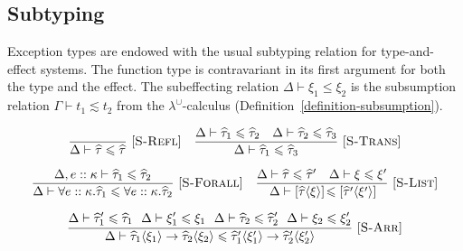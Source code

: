 \documentclass{llncs}
\renewcommand{\leq}{\leqslant}
\newcommand{\Rule}[3]{\frac{#2}{#3}\mbox{\ [\textsc{#1}]}}
\newcommand{\LambdaUnion}{\lambda^\cup}
\newcommand{\LuEnv}{\Gamma}
\newcommand{\LuTm}{t}
\newcommand{\JudgeLuSub}[3][\LuEnv]{#1 \vdash #2 \lesssim #3}
\newcommand{\Throws}[2]{#1\langle #2\rangle}    %
\newcommand{\ExnTy}{\widehat\tau}
\newcommand{\ExnTyBool}{\mathrm{b\widehat{oo}l}}    %
\newcommand{\ExnTyList}[2]{\left[\Throws{#1}{#2}\right]\!}
\newcommand{\ExnTyArr}[4]{\Throws{#1}{#2} \to \Throws{#3}{#4}}
\newcommand{\ExnForall}[1]{\forall {#1}.}           %
\newcommand{\Exn}{\xi}
\newcommand{\ExnVar}{e}
\newcommand{\ExnBool}{\mathbf{b\widehat{oo}l}}      %
\newcommand{\ExnInt}{\mathbf{i\widehat{n}t}}        %
\newcommand{\Kind}{\kappa}                          %
\newcommand{\KiEnv}{\Delta}
\newcommand{\JudgeSubTy}[3]{{#1 \vdash #2 \leq #3}}
\newcommand{\JudgeSubExn}[3]{{#1 \vdash #2 \leq #3}}
\begin{document}
\subsection{Subtyping}

Exception types are endowed with the usual subtyping relation for type-and-effect systems. The function type is contravariant in its first argument for both the type and the effect. The subeffecting relation $\JudgeSubExn{\KiEnv}{\Exn_1}{\Exn_2}$ is the subsumption relation $\JudgeLuSub{\LuTm_1}{\LuTm_2}$ from the $\LambdaUnion$-calculus (Definition~\ref{definition-subsumption}).

    \begin{gather*}
        \Rule{S-Refl}
             {}
             {\JudgeSubTy{\KiEnv}{\ExnTy}{\ExnTy}}
        \quad
        \Rule{S-Trans}
             {\JudgeSubTy{\KiEnv}{\ExnTy_1}{\ExnTy_2}
              \quad
              \JudgeSubTy{\KiEnv}{\ExnTy_2}{\ExnTy_3}
             }
             {\JudgeSubTy{\KiEnv}{\ExnTy_1}{\ExnTy_3}}
        \\[1.5ex]
        \Rule{S-Forall}
             {\JudgeSubTy{\KiEnv, \ExnVar :: \Kind}{\ExnTy_1}{\ExnTy_2}}
             {\JudgeSubTy{\KiEnv}
                         {\ExnForall{\ExnVar :: \Kind}{\ExnTy_1}}
                         {\ExnForall{\ExnVar :: \Kind}{\ExnTy_2}}
             }
        \quad
        \Rule{S-List}
             {\JudgeSubTy{\KiEnv}{\ExnTy}{\ExnTy^\prime}
                \quad
              \JudgeSubExn{\KiEnv}{\Exn}{\Exn^\prime}
             }
             {\JudgeSubTy{\KiEnv}
                         {\ExnTyList{\ExnTy}{\Exn}}
                         {\ExnTyList{\ExnTy^\prime}{\Exn^\prime}}
             }
        \\[1.5ex]
        \Rule{S-Arr}
             {\begin{gathered}
              \JudgeSubTy{\KiEnv}{\ExnTy_1^\prime}{\ExnTy_1}
                \ \ 
              \JudgeSubExn{\KiEnv}{\Exn_1^\prime}{\Exn_1}
                \ \ 
              \JudgeSubTy{\KiEnv}{\ExnTy_2}{\ExnTy_2^\prime}
                \ \ 
              \JudgeSubExn{\KiEnv}{\Exn_2}{\Exn_2^\prime}
              \end{gathered}
             }
             {\JudgeSubTy{\KiEnv}
                         {\ExnTyArr{\ExnTy_1}{\Exn_1}{\ExnTy_2}{\Exn_2}}
                         {\ExnTyArr{\ExnTy_1^\prime}{\Exn_1^\prime}{\ExnTy_2^\prime}{\Exn_2^\prime}}
             }
    \end{gather*}
\end{document}
